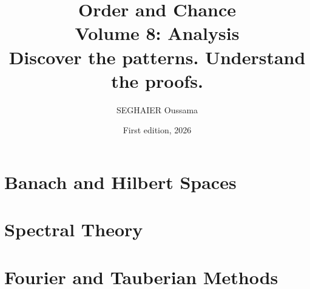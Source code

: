 \documentclass[11pt,openany]{book}
\title{\Huge\textbf{Order and Chance}\\[0.4em]\LARGE Volume 8: Analysis\\[0.6em]
\Large Discover the patterns. Understand the proofs.}
\author{SEGHAIER Oussama}
\date{First edition, 2026}
\begin{document}
\frontmatter
\makecover
\maketitle

\tableofcontents

\mainmatter

\part{Banach and Hilbert Spaces}


\part{Spectral Theory}


\part{Fourier and Tauberian Methods}







\end{document}

